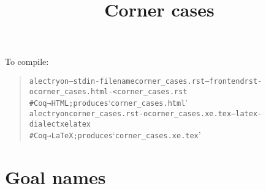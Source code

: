 \documentclass[a4paper]{article}
\title{Corner cases%
  \label{corner-cases}}
\author{}
\date{}
\begin{document}
\maketitle

To compile:

\begin{quote}
\begin{alltt}
alectryon --stdin-filename corner_cases.rst --frontend rst -o corner_cases.html - < corner_cases.rst
  # Coq → HTML; produces ‘corner_cases.html’
alectryon corner_cases.rst -o corner_cases.xe.tex --latex-dialect xelatex
  # Coq → LaTeX; produces ‘corner_cases.xe.tex’
\end{alltt}
\end{quote}


\section{Goal names%
  \label{goal-names}%
}
\end{document}
